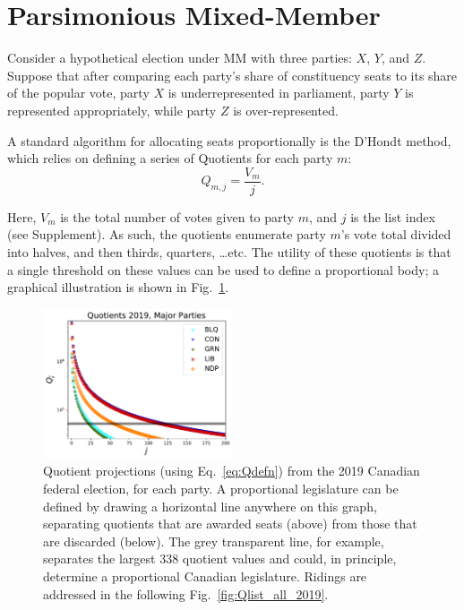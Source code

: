 \section{Parsimonious Mixed-Member}
\label{sec:model_proposal}

Consider a hypothetical election under MM with three parties: $X$, $Y$, and $Z$. Suppose that after comparing each party's share of constituency seats to its share of the popular vote, party $X$ is underrepresented in parliament, party $Y$ is represented appropriately, while party $Z$ is over-represented.

A standard algorithm for allocating seats proportionally is the D'Hondt method, which relies on defining a series of Quotients for each party $m$:
\begin{equation}
\label{eq:Qdefn}
Q_{m,j} = \frac{V_m}{j}.
\end{equation}

Here, $V_m$ is the total number of votes given to party $m$, and $j$ is the list index (see Supplement).
As such, the quotients enumerate party $m$'s vote total divided into halves, and then thirds, quarters, \ldots etc. The utility of these quotients is that a single threshold on these values can be used to define a proportional body; a graphical illustration is shown in Fig.~\ref{fig:Qlist_byparty_2019}.


\begin{figure} %
  \includegraphics[width=0.50\textwidth,clip]{PR_calcs/data/raw_2019/PMM_out/PMM_Qlist_byparty}
  \captionsetup{format=default}
  \caption{Quotient projections (using Eq.~\ref{eq:Qdefn}) from the 2019 Canadian federal election, for each party. A proportional legislature can be defined by drawing a horizontal line anywhere on this graph, separating quotients that are awarded seats (above) from those that are discarded (below). The grey transparent line, for example, separates the largest 338 quotient values and could, in principle, determine a proportional Canadian legislature. Ridings are addressed in the following Fig.~\ref{fig:Qlist_all_2019}. }
\label{fig:Qlist_byparty_2019}
\end{figure}

